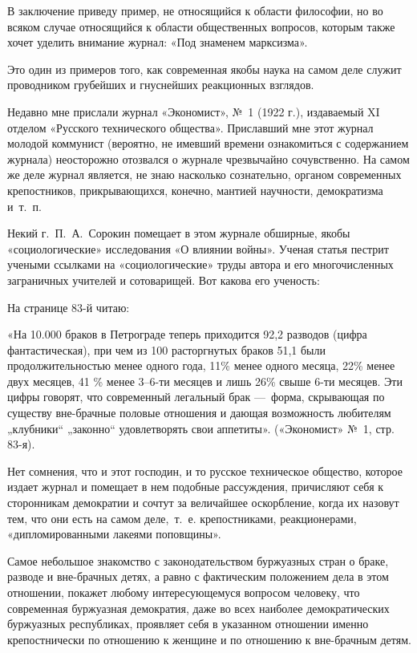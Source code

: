 В заключение приведу пример, не относящийся к области философии, но во
всяком случае относящийся к области общественных вопросов, которым также
хочет уделить внимание журнал: «Под знаменем марксизма».

Это один из примеров того, как современная якобы наука на самом деле служит
проводником грубейших и гнуснейших реакционных взглядов.

Недавно мне прислали журнал «Экономист», №~1 (1922 г.),
издаваемый XI отделом «Русского технического общества». Приславший мне этот
журнал молодой коммунист (вероятно, не имевший времени ознакомиться с
содержанием журнала) неосторожно отозвался о журнале чрезвычайно
сочувственно. На самом же деле журнал является, не знаю насколько
сознательно, органом современных крепостников, прикрывающихся, конечно,
мантией научности, демократизма и~т.~п.

Некий г.~П.~А.~Сорокин помещает в этом
журнале обширные, якобы «социологические» исследования «О влиянии войны».
Ученая статья пестрит учеными ссылками на «социологические» труды автора и
его многочисленных заграничных учителей и сотоварищей. Вот какова его
ученость:

На странице 83-й читаю:

«На 10.000 браков в Петрограде теперь приходится 92,2 разводов (цифра
фантастическая), при чем из 100 расторгнутых браков 51,1 были
продолжительностью менее одного года, 11\% менее одного месяца, 22\% менее
двух месяцев, 41 \% менее 3–6-ти месяцев и лишь 26\% свыше 6-ти месяцев.
Эти цифры говорят, что современный легальный брак —~форма, скрывающая по
существу вне-брачные половые отношения и дающая возможность любителям
„клубники“ „законно“ удовлетворять свои аппетиты». («Экономист»
№~1, стр. 83-я).

Нет сомнения, что и этот господин, и то русское техническое общество,
которое издает журнал и помещает в нем подобные рассуждения, причисляют
себя к сторонникам демократии и сочтут за величайшее оскорбление, когда их
назовут тем, что они есть на самом деле,~т.~е. крепостниками,
реакционерами, «дипломированными лакеями поповщины».

Самое небольшое знакомство с законодательством буржуазных стран о браке,
разводе и вне-брачных детях, а равно с фактическим положением дела в этом
отношении, покажет любому интересующемуся вопросом человеку, что
современная буржуазная демократия, даже во всех наиболее демократических
буржуазных республиках, проявляет себя в указанном отношении именно
крепостнически по отношению к женщине и по отношению к вне-брачным детям.

